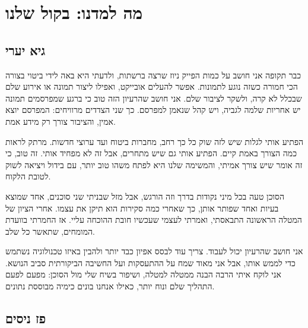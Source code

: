 %   
%

\chapter{מה למדנו: בקול שלנו}\label{ch:reflection}

\section{גיא יערי}
כבר תקופה אני חושב על כמות הפייק ניוז שרצה ברשתות, ולדעתי היא באה לידי ביטוי בצורה הכי חמורה כשזה נוגע לתמונות. אפשר להעלים אובייקט, ואפילו ליצור תמונה או אירוע שלם שבכלל לא קרה, ולשקר לציבור שלם. אני חושב שהרעיון הזה טוב כי ברגע שמפרסמים תמונה יש אחריות שלמה לגביה, ויש קהל שנאמן למפרסם. כך שני הצדדים מרוויחים: המפרסם יוצא אמין, והציבור צורך רק מידע אמת.

הפתיע אותי לגלות שיש לזה שוק כל כך רחב, מחברות ביטוח ועד ערוצי חדשות. מרתק לראות כמה הצורך באמת קיים. הפתיע אותי גם שיש מתחרים, אבל זה לא מפחיד אותי. זה טוב, כי זה אומר שיש צורך אמיתי, והמשימה שלנו היא לפתח משהו טוב יותר, עם בידול ויציאה לשוק לטובת הלקוח.

הסוכן טעה בכל מיני נקודות בדרך וזה הורגש, אבל מזל שבניתי שני סוכנים, אחד שמוצא בעיות ואחד שפותר אותן, כך שאחרי כמה סקירות הוא תיקן את עצמו. אחרי הציון של המטלה הראשונה התבאסתי, ואמרתי לעצמי שעכשיו חובת ההוכחה עליי. אז החמרתי בוועדת המומחים, שתאשר כל שלב.

אני חושב שהרעיון יכול לעבוד. צריך עוד לבסס אפיון כבד יותר ולהבין באיזו טכנולוגיה נשתמש כדי לממש אותו, אבל אני מאוד שמח על ההתעסקות ועל החשיבה הביקורתית סביב הנושא. אני לוקח איתי הרבה הבנה ממטלה למטלה, ושיפור בשיח שלי מול הסוכן: מפעם לפעם התהליך שלם ונוח יותר, כאילו אנחנו בונים כימיה מבוססת נתונים.

\section{פז ניסים}
